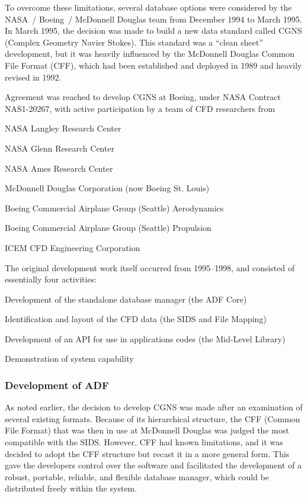 To overcome these limitations, several database options were considered
by the NASA~/ Boeing~/ McDonnell Douglas team from December 1994 to
March 1995.
In March 1995, the decision was made to build a new data standard called
CGNS (Complex Geometry Navier Stokes).
This standard was a ``clean sheet'' development, but it was heavily
influenced by the McDonnell Douglas Common File Format (CFF), which had
been established and deployed in 1989 and heavily revised in 1992.

Agreement was reached to develop CGNS at Boeing, under NASA Contract
NAS1-20267, with active participation by a team of CFD researchers from

\begin{itemize*}
   \item NASA Langley Research Center
   \item NASA Glenn Research Center
   \item NASA Ames Research Center
   \item McDonnell Douglas Corporation (now Boeing St. Louis)
   \item Boeing Commercial Airplane Group (Seattle) Aerodynamics
   \item Boeing Commercial Airplane Group (Seattle) Propulsion
   \item ICEM CFD Engineering Corporation
\end{itemize*}

The original development work itself occurred from 1995--1998, and
consisted of essentially four activities:

\begin{itemize*}
\item Development of the standalone database manager (the ADF Core)
\item Identification and layout of the CFD data (the SIDS and File
      Mapping)
\item Development of an API for use in applications codes (the
      Mid-Level Library)
\item Demonstration of system capability
\end{itemize*}

\subsubsection{Development of ADF}

As noted earlier, the decision to develop CGNS was made after an
examination of several existing formats.
Because of its hierarchical structure, the CFF (Common File Format) that
was then in use at McDonnell Douglas was judged the most compatible with
the SIDS.
However, CFF had known limitations, and it was decided to adopt the CFF
structure but recast it in a more general form.
This gave the developers control over the software and facilitated the
development of a robust, portable, reliable, and flexible database
manager, which could be distributed freely within the system.

